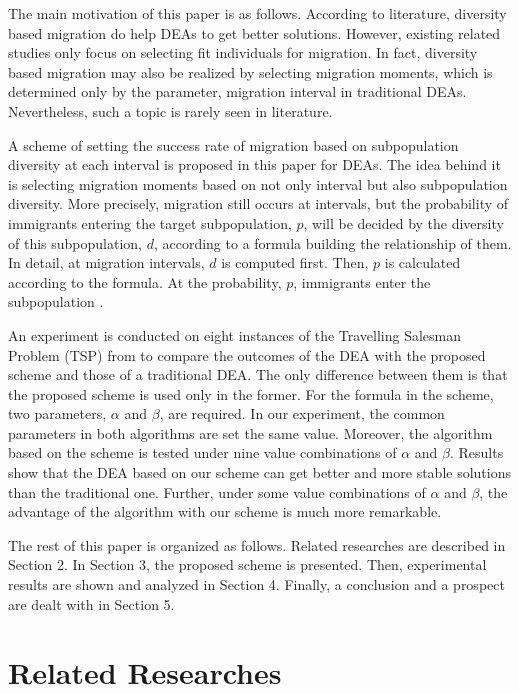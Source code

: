 \documentclass[journal,onecolumn]{IEEEtran}
\begin{document}
The main motivation of this paper is as follows.
According to literature, diversity based migration do help DEAs to get better solutions.
However, existing related studies only focus on selecting fit individuals for migration.
In fact, diversity based migration may also be realized by selecting migration moments, which is determined only by the parameter, migration interval in traditional DEAs.
Nevertheless, such a topic is rarely seen in literature.

A scheme of setting the success rate of migration based on subpopulation diversity at each interval is proposed in this paper for DEAs.
The idea behind it is selecting migration moments based on not only interval but also subpopulation diversity.
More precisely, migration still occurs at intervals, but the probability of immigrants entering the target subpopulation, $p$, will be decided by the diversity of this subpopulation, $d$, according to a formula building the relationship of them.
In detail, at migration intervals, $d$ is computed first.
Then, $p$ is calculated according to the formula.
At the probability, $p$, immigrants enter the subpopulation .

An experiment is conducted on eight instances of the Travelling Salesman Problem (TSP) from \cite{reinelt1991tsplib} to compare the outcomes of the DEA with the proposed scheme and those of a traditional DEA.
The only difference between them is that the proposed scheme is used only in the former.
For the formula in the scheme, two parameters, $\alpha$ and $\beta$, are required.
In our experiment, the common parameters in both algorithms are set the same value.
Moreover, the algorithm based on the scheme is tested under nine value combinations of $\alpha$ and $\beta$.
Results show that the DEA based on our scheme can get better and more stable solutions than the traditional one.
Further, under some value combinations of $\alpha$ and $\beta$, the advantage of the algorithm with our scheme is much more remarkable.

The rest of this paper is organized as follows.
Related researches are described in Section 2.
In Section 3, the proposed scheme is presented.
Then, experimental results are shown and analyzed in Section 4.
Finally, a conclusion and a prospect are dealt with in Section 5.
%
\section{Related Researches}
\end{document}
